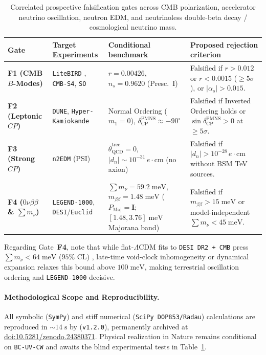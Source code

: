 \documentclass[11pt,a4paper]{article}
\begin{document}
\begin{table}[htbp]
\centering
\caption{Correlated prospective falsification gates across CMB polarization, accelerator neutrino oscillation, neutron EDM, and neutrinoless double-beta decay / cosmological neutrino mass.}
\label{tab:falsification}
\vspace{0.35em}
\footnotesize
\begin{tabularx}{\textwidth}{ll>{\raggedright\arraybackslash}X>{\raggedright\arraybackslash}X}
\toprule
Gate & Target Experiments & Conditional benchmark & Proposed rejection criterion \\
\midrule
\textbf{F1 (CMB $B$-Modes)} & \texttt{LiteBIRD} \cite{LiteBIRD2023}, \texttt{CMB-S4}, \texttt{SO} & $r = 0.00426$, $n_s = 0.9620$ (Presc.~I) & Falsified if $r > 0.012$ or $r < 0.0015$ ($\ge 5\sigma$), or $|\alpha_s| > 0.015$. \\
\textbf{F2 (Leptonic $CP$)} & \texttt{DUNE}, \texttt{Hyper-Kamiokande} & Normal Ordering ($m_1 = 0$), $\delta_{\mathrm{CP}}^{\mathrm{PMNS}} \approx -90^\circ$ & Falsified if Inverted Ordering holds or $\sin\delta_{\mathrm{CP}}^{\mathrm{PMNS}} > 0$ at $\ge 5\sigma$. \\
\textbf{F3 (Strong $CP$)} & \texttt{n2EDM} (PSI) & $\bar{\theta}_{\mathrm{QCD}}^{\mathrm{tree}} = 0$, $|d_n| \sim 10^{-31}\,e\cdot\mathrm{cm}$ (no axion) & Falsified if $|d_n| > 10^{-28}\,e\cdot\mathrm{cm}$ without BSM TeV sources. \\
\textbf{F4 ($0\nu\beta\beta$ \& $\sum m_\nu$)} & \texttt{LEGEND-1000}, \texttt{DESI}/\texttt{Euclid} & $\sum m_\nu = 59.2\;\mathrm{meV}$, $m_{\beta\beta} = 1.48\;\mathrm{meV}$ ($P_{\mathrm{Maj}} = \mathbf{I}$; $[1.48, 3.76]\;\mathrm{meV}$ Majorana band) & Falsified if $m_{\beta\beta} > 15\;\mathrm{meV}$ or model-independent $\sum m_\nu < 45\;\mathrm{meV}$. \\
\bottomrule
\end{tabularx}
\end{table}

Regarding Gate~\textbf{F4}, note that while flat-$\Lambda\mathrm{CDM}$ fits to \texttt{DESI DR2 + CMB} press $\sum m_\nu < 64\;\mathrm{meV}$ ($95\%$ CL) \cite{DESIDR2_2025}, late-time void-clock inhomogeneity or dynamical expansion relaxes this bound above $100\;\mathrm{meV}$, making terrestrial oscillation ordering and \texttt{LEGEND-1000} decisive.

\paragraph{Methodological Scope and Reproducibility.}
All symbolic (\texttt{SymPy}) and stiff numerical (\texttt{SciPy DOP853/Radau}) calculations are reproduced in $\sim 14\;\mathrm{s}$ by  (\texttt{v1.2.0}), permanently archived at \href{https://doi.org/10.5281/zenodo.24380371}{doi:10.5281/zenodo.24380371}. Physical realization in Nature remains conditional on \texttt{BC-UV-CW} and awaits the blind experimental tests in Table~\ref{tab:falsification}.
\end{document}
